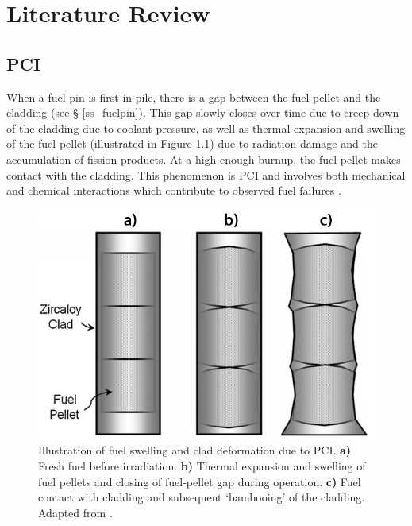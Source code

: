 \chapter{Literature Review}

\label{literature_review}

\section{PCI}

When a fuel pin is first in-pile, there is a gap between the fuel pellet and the cladding (see § \ref{ss_fuelpin}). This gap slowly closes over time due to creep-down of the cladding due to coolant pressure, as well as thermal expansion and swelling of the fuel pellet (illustrated in Figure \ref{figure:pcmi}) due to radiation damage and the accumulation of fission products. At a high enough burnup, the fuel pellet makes contact with the cladding. This phenomenon is PCI and involves both mechanical and chemical interactions which contribute to observed fuel failures \cite{bcoxpelletclad1990}.

\begin{figure}[ht] %
\centering
\includegraphics[width=13cm]{images/pcmi.png}
\caption[Illustration of fuel swelling and clad deformation due to PCI. \textbf{a)} Fresh fuel before irradiation. \textbf{b)} Thermal expansion and swelling of fuel pellets and closing of fuel-pellet gap during operation. \textbf{c)} Fuel contact with cladding and subsequent `bambooing' of the cladding.]{Illustration of fuel swelling and clad deformation due to PCI. \textbf{a)} Fresh fuel before irradiation. \textbf{b)} Thermal expansion and swelling of fuel pellets and closing of fuel-pellet gap during operation. \textbf{c)} Fuel contact with cladding and subsequent `bambooing' of the cladding. Adapted from \cite{alam2011review}.}
\label{figure:pcmi}
\end{figure}


